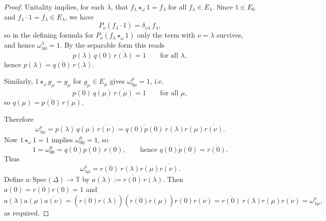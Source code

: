 \documentclass[10pt,a4paper]{amsart}
\newcommand{\Spec}{\mathrm{Spec}}
\newcommand{\bbT}{\mathbb{T}}
\begin{document}
\begin{proof}
Unitality implies, for each $\lambda$, that $f_\lambda\star_\omega 1=f_\lambda$ for all $f_\lambda\in E_\lambda$.
Since $1\in E_0$ and $f_\lambda\cdot 1=f_\lambda\in E_\lambda$, we have
\[
P_\nu(f_\lambda\cdot 1)=\delta_{\nu\lambda}\,f_\lambda,
\]
so in the defining formula for $P_\nu(f_\lambda\star_\omega 1)$ only the term with $\nu=\lambda$ survives, and hence $\omega^\lambda_{\lambda 0}=1$.
By the separable form this reads
\[
p(\lambda)\,q(0)\,\overline{r(\lambda)}=1\qquad\text{for all }\lambda,
\]
hence $p(\lambda)=\overline{q(0)}\,r(\lambda)$.

Similarly, $1\star_\omega g_\mu=g_\mu$ for $g_\mu\in E_\mu$ gives $\omega^\mu_{0\mu}=1$, i.e.
\[
p(0)\,q(\mu)\,\overline{r(\mu)}=1\qquad\text{for all }\mu,
\]
so $q(\mu)=\overline{p(0)}\,r(\mu)$.

Therefore
\[
\omega^\nu_{\lambda\mu}
=
p(\lambda)\,q(\mu)\,\overline{r(\nu)}
=
\overline{q(0)p(0)}\ r(\lambda)r(\mu)\overline{r(\nu)}.
\]
Now $1\star_\omega 1=1$ implies $\omega^0_{00}=1$, so
\[
1=\omega^0_{00}=\overline{q(0)p(0)}\ r(0),
\qquad\text{hence }\overline{q(0)p(0)}=\overline{r(0)}.
\]
Thus
\[
\omega^\nu_{\lambda\mu}=\overline{r(0)}\ r(\lambda)r(\mu)\overline{r(\nu)}.
\]
Define $a:\Spec(\Delta)\to\bbT$ by $a(\lambda):=\overline{r(0)}\,r(\lambda)$.
Then $a(0)=\overline{r(0)}r(0)=1$ and
\[
a(\lambda)a(\mu)\overline{a(\nu)}
=
(\overline{r(0)}r(\lambda))(\overline{r(0)}r(\mu))\overline{\overline{r(0)}r(\nu)}
=
\overline{r(0)}\ r(\lambda)r(\mu)\overline{r(\nu)}
=
\omega^\nu_{\lambda\mu},
\]
as required.
\end{proof}
\end{document}
